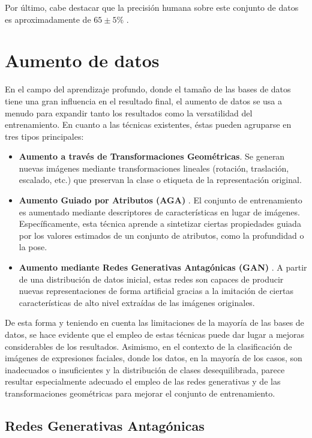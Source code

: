 Por último, cabe destacar que la precisión humana sobre este conjunto de datos es aproximadamente de $65\pm 5\%$ \cite{FER-2013_human_acc}.

\section{Aumento de datos}

En el campo del aprendizaje profundo, donde el tamaño de las bases de datos tiene una gran influencia en el resultado final, el aumento de datos se usa a menudo para expandir tanto los resultados como la versatilidad del entrenamiento. En cuanto a las técnicas existentes, éstas pueden agruparse en tres tipos principales:

\begin{itemize}
    \item \textbf{Aumento a través de Transformaciones Geométricas}. Se generan nuevas imágenes mediante transformaciones lineales (rotación, traslación, escalado, etc.) que preservan la clase o etiqueta de la representación original.
    \item \textbf{Aumento Guiado por Atributos (AGA)} \cite{AGA}. El conjunto de entrenamiento es aumentado mediante descriptores de características en lugar de imágenes. Específicamente, esta técnica aprende a sintetizar ciertas propiedades guiada por los valores estimados de un conjunto de atributos, como la profundidad o la pose.
    \item \textbf{Aumento mediante Redes Generativas Antagónicas (GAN)} \cite{GAN}. A partir de una distribución de datos inicial, estas redes son capaces de producir nuevas representaciones de forma artificial gracias a la imitación de ciertas características de alto nivel extraídas de las imágenes originales.
\end{itemize}

De esta forma y teniendo en cuenta las limitaciones de la mayoría de las bases de datos, se hace evidente que el empleo de estas técnicas puede dar lugar a mejoras considerables de los resultados. Asimismo, en el contexto de la clasificación de imágenes de expresiones faciales, donde los datos, en la mayoría de los casos, son inadecuados o insuficientes y la distribución de clases desequilibrada, parece resultar especialmente adecuado el empleo de las redes generativas y de las transformaciones geométricas para mejorar el conjunto de entrenamiento.

\subsection{Redes Generativas Antagónicas}


